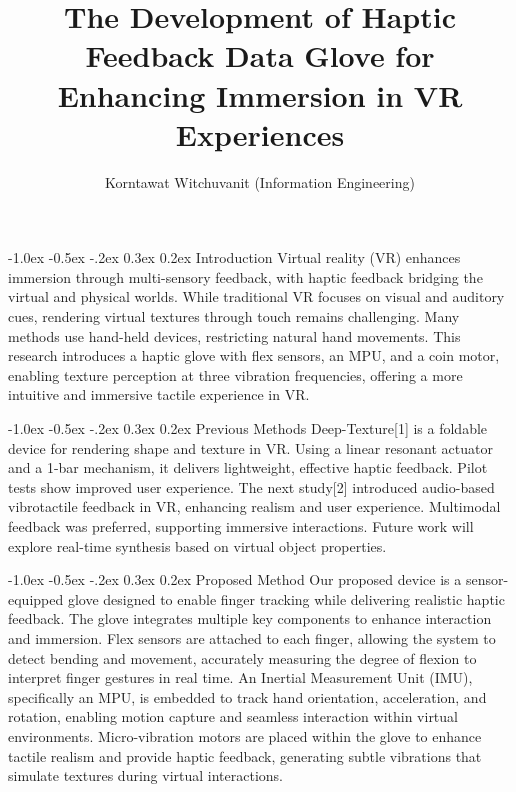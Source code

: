 \documentclass[a4paper,twocolumn]{article}
\title{\normalsize\textbf{\vspace{-2ex}The Development of Haptic Feedback Data Glove for Enhancing Immersion in VR Experiences}}
\author{\small{Korntawat Witchuvanit (Information Engineering)}}
\date{}
\begin{document}
\small
\maketitle

\makeatletter
\renewcommand\section{\@startsection{section}{1}{\z@}%
  {-1.0ex \@plus -0.5ex \@minus -.2ex}%
  {0.3ex \@plus 0.2ex}%
  {\normalfont\small\bfseries}}
\makeatother

\section{Introduction}
Virtual reality (VR) enhances immersion through multi-sensory feedback, with haptic feedback bridging the virtual and physical worlds. While traditional VR focuses on visual and auditory cues, rendering virtual textures through touch remains challenging. Many methods use hand-held devices, restricting natural hand movements. This research introduces a haptic glove with flex sensors, an MPU, and a coin motor, enabling texture perception at three vibration frequencies, offering a more intuitive and immersive tactile experience in VR.

\section{Previous Methods}
Deep-Texture[1] is a foldable device for rendering shape and texture in VR. Using a linear resonant actuator and a 1-bar mechanism, it delivers lightweight, effective haptic feedback. Pilot tests show improved user experience. The next study[2] introduced audio-based vibrotactile feedback in VR, enhancing realism and user experience. Multimodal feedback was preferred, supporting immersive interactions. Future work will explore real-time synthesis based on virtual object properties.

\section{Proposed Method}
Our proposed device is a sensor-equipped glove designed to enable finger tracking while delivering realistic haptic feedback. The glove integrates multiple key components to enhance interaction and immersion. Flex sensors are attached to each finger, allowing the system to detect bending and movement, accurately measuring the degree of flexion to interpret finger gestures in real time. An Inertial Measurement Unit (IMU), specifically an MPU, is embedded to track hand orientation, acceleration, and rotation, enabling motion capture and seamless interaction within virtual environments. Micro-vibration motors are placed within the glove to enhance tactile realism and provide haptic feedback, generating subtle vibrations that simulate textures during virtual interactions.
\end{document}
